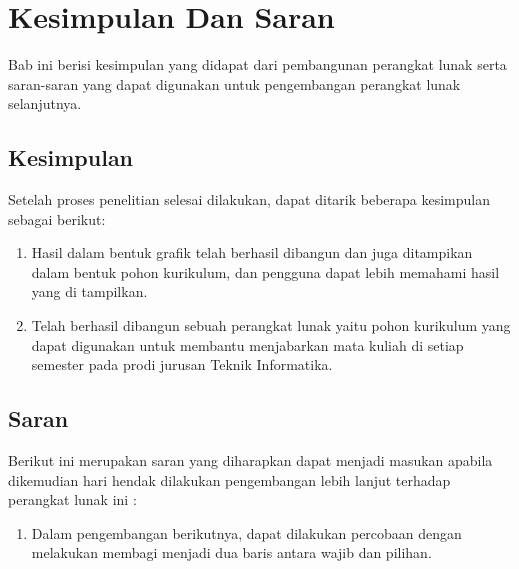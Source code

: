 \chapter{Kesimpulan Dan Saran}
\label{chap:Kesimpulan Dan Saran}

Bab ini berisi kesimpulan yang didapat dari pembangunan perangkat lunak serta saran-saran yang dapat digunakan
untuk pengembangan perangkat lunak selanjutnya.

\section{Kesimpulan}
\label{sec: Kesimpulan}

Setelah proses penelitian selesai dilakukan, dapat ditarik beberapa kesimpulan sebagai berikut:
\begin{enumerate}
\item Hasil dalam bentuk grafik telah berhasil dibangun dan juga ditampikan dalam
bentuk pohon kurikulum, dan pengguna dapat lebih memahami hasil yang di tampilkan.
\item Telah berhasil dibangun sebuah perangkat lunak yaitu pohon kurikulum yang dapat digunakan untuk membantu menjabarkan mata kuliah di setiap semester pada prodi jurusan Teknik Informatika.
\end{enumerate}


\section{Saran}
\label{sec: Saran}

Berikut ini merupakan saran yang diharapkan dapat menjadi masukan apabila dikemudian hari hendak dilakukan pengembangan lebih lanjut terhadap perangkat lunak ini :

\begin{enumerate}
	\item Dalam pengembangan berikutnya, dapat dilakukan percobaan dengan melakukan membagi menjadi dua baris antara wajib dan pilihan.

\end{enumerate}